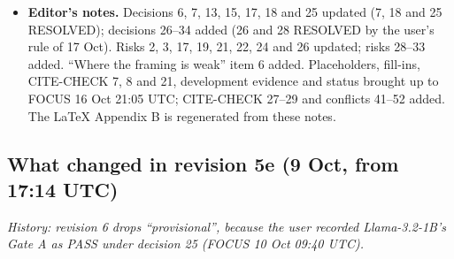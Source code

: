 \documentclass{article}
\theoremstyle{plain}
\theoremstyle{definition}
\theoremstyle{remark}
\begin{document}
\begin{itemize}
$$        \nolinkurl{scripts/notes_md_to_tex_rev5c.py},
        \nolinkurl{scripts/wrap_tex.py}, \nolinkurl{rev5d/splice.py}) no longer
        existed (the scratchpad's files were cleared; only empty folders were
        left). They were re-created in \nolinkurl{rev6/scripts/}: the body
        measure reproduces revision 5e's 9.36 pages on its PDF; the notes
        converter follows revision 5e's Appendix B conventions (conflict 41).
  \item \textbf{Editor's notes.} Decisions 6, 7, 13, 15, 17, 18 and 25 updated
        (7, 18 and 25 RESOLVED); decisions 26--34 added (26 and 28 RESOLVED by
        the user's rule of 17 Oct). Risks 2, 3, 17, 19, 21, 22, 24 and 26
        updated; risks 28--33 added. ``Where the framing is weak'' item 6 added.
        Placeholders, fill-ins, CITE-CHECK 7, 8 and 21, development evidence and
        status brought up to FOCUS 16 Oct 21:05 UTC; CITE-CHECK 27--29 and
        conflicts 41--52 added. The LaTeX Appendix B is regenerated from these
        notes.
\end{itemize}

\subsection{What changed in revision 5e (9 Oct, from 17:14 UTC)}

\emph{History: revision 6 drops ``provisional'', because the user recorded
Llama-3.2-1B's Gate A as PASS under decision 25 (FOCUS 10 Oct 09:40 UTC).}
\end{document}
